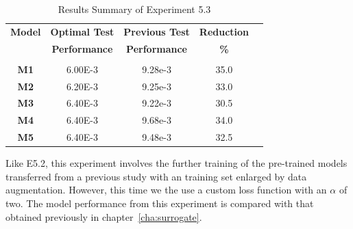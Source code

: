\begin{table}[h!]
	 \begin{center}
		
		\begin{tabular}{c|c|c|c|c} %
			\textbf{Model} & \textbf{Optimal Test} & \textbf{Previous Test} & \textbf{Reduction}  \\
			
			\textbf{} & \textbf{Performance} & \textbf{Performance} & \textbf{\%} \\
			
			\hline
			& & & \\
			\textbf{M1} & 6.00E-3 & 9.28e-3 & 35.0 \\
			\textbf{M2} & 6.20E-3 & 9.25e-3 & 33.0\\
			\textbf{M3} & 6.40E-3 & 9.22e-3 & 30.5\\
			\textbf{M4} & 6.40E-3 & 9.68e-3 & 34.0 \\
			\textbf{M5} & 6.40E-3 & 9.48e-3 & 32.5\\
			
			
		\end{tabular}
		\caption{Results Summary of Experiment 5.3} {Like E5.2, this experiment involves the further training of the pre-trained models transferred from a previous study with an training set enlarged by data augmentation. However, this time we the use a custom loss function with an $\alpha$ of two. The model performance from this experiment is compared with that obtained previously in chapter~\ref{cha:surrogate}. }
		\label{tab:Experiment5p3results}
		 \end{center}
\end{table}

